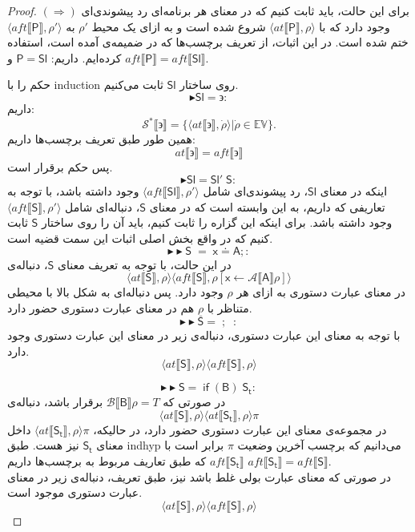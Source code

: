 \begin{proof}
	$(\Rightarrow)$
	برای این حالت، باید ثابت کنیم که در معنای هر برنامه‌ای رد پیشوندی‌ای وجود دارد که با
	$\langle at\llbracket \mathsf{P} \rrbracket , \rho \rangle$
	شروع شده است و به ازای یک محیط $\rho'$ به 
	$\langle aft\llbracket \mathsf{P} \rrbracket , \rho' \rangle$
	ختم شده است. 
	در این اثبات، از تعریف برچسب‌ها که در ضمیمه‌ی \cite{calcul} آمده است، استفاده کرده‌ایم.
	داریم:
	$\mathsf{P=Sl}$
	و 
	$aft \llbracket \mathsf{P} \rrbracket = aft \llbracket \mathsf{Sl} \rrbracket $.
	
	حکم را با \gls*{induction} روی ساختار $\mathsf{Sl}$ ثابت می‌کنیم. 
	$$\blacktriangleright \mathsf{Sl = \backepsilon}:$$
	داریم:
	$$\mathcal{S^*} \llbracket \backepsilon \rrbracket = \{\langle at \llbracket \backepsilon \rrbracket , \dot{\rho} \rangle | \dot{\rho} \in \mathbb{EV}\}.$$
	همین طور طبق تعریف برچسب‌ها داریم:
	$$at \llbracket \backepsilon \rrbracket = aft \llbracket \backepsilon \rrbracket$$
	پس حکم برقرار است.
	$$\blacktriangleright \mathsf{Sl =Sl'\;S}:$$
	اینکه در معنای $\mathsf{Sl}$، رد پیشوندی‌ای شامل
	 $\langle aft \llbracket \mathsf{Sl} \rrbracket , \rho '\rangle$ وجود داشته باشد، با توجه به تعاریفی که داریم، به این وابسته است که در معنای
	  $\mathsf{S}$،
	   دنباله‌ای شامل $\langle aft \llbracket \mathsf{S} \rrbracket , \rho' \rangle$ وجود داشته باشد. برای اینکه این گزاره را ثابت کنیم، باید آن را روی ساختار $\mathsf{S}$ ثابت کنیم که در واقع بخش اصلی اثبات این سمت قضیه است. 
	$$\blacktriangleright\blacktriangleright \mathsf{S\;=\; x\doteq A;}:$$
	در این حالت، با توجه به تعریف معنای $\mathsf{S}$، دنباله‌ی 
	$$\langle at \llbracket \mathsf{S} \rrbracket ,\rho \rangle \langle aft\llbracket\mathsf{S}\rrbracket , \rho[\mathsf{x}\leftarrow \mathcal{A}\llbracket\mathsf{A}\rrbracket\rho] \rangle $$
	در معنای عبارت‌ دستوری به ازای هر $\rho$ وجود دارد. پس دنباله‌ای به شکل بالا با محیطی متناظر با
	$\underline{\rho}$
	هم در معنای عبارت‌ دستوری حضور دارد.
	$$\blacktriangleright\blacktriangleright \mathsf{S=\; ; \;\;}:$$	 
با توجه به معنای این عبارت‌ دستوری، دنباله‌ی زیر در معنای این عبارت‌ دستوری وجود دارد.
$$\langle at \llbracket \mathsf{S} \rrbracket ,\rho \rangle \langle aft\llbracket\mathsf{S}\rrbracket , \rho \rangle $$

$$\blacktriangleright\blacktriangleright \mathsf{S=\; if\;(B)\;S_t}:$$
	در صورتی که 
	$\mathcal{B}\llbracket\mathsf{B}\rrbracket\rho=\mathit{T}$
	برقرار باشد، دنباله‌ی 
	$$\langle at \llbracket \mathsf{S} \rrbracket , \rho \rangle
	\langle at \llbracket \mathsf{S_t} \rrbracket , \rho \rangle \pi$$
	در مجموعه‌ی معنای این عبارت‌ دستوری حضور دارد، در حالیکه، 
	$\langle at \llbracket \mathsf{S_t} \rrbracket , \rho \rangle \pi$
	داخل معنای $\mathsf{S_t}$ نیز هست. طبق \gls*{indhyp} می‌دانیم که برچسب آخرین وضعیت $\pi$ برابر است با $aft \llbracket \mathsf{S_t} \rrbracket$ که طبق تعاریف مربوط به برچسب‌ها داریم
	$aft \llbracket \mathsf{S_t} \rrbracket=aft \llbracket \mathsf{S} \rrbracket$.\\
	در صورتی که معنای عبارت بولی غلط باشد نیز، طبق تعریف، دنباله‌ی زیر در معنای عبارت‌ دستوری موجود است.
	$$\langle at \llbracket \mathsf{S} \rrbracket ,\rho \rangle \langle aft\llbracket\mathsf{S}\rrbracket , \rho \rangle $$
	

\end{proof}
